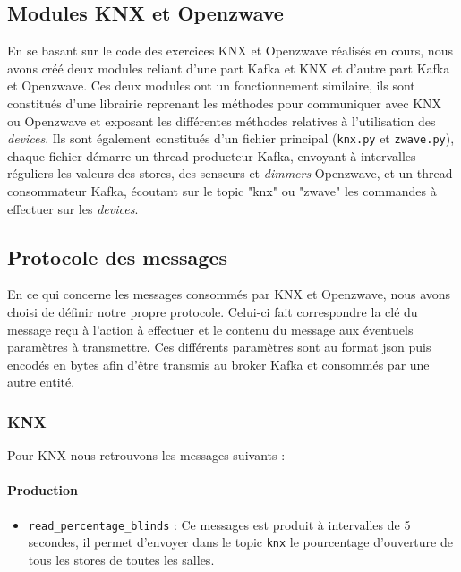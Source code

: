 \subsection{Modules KNX et Openzwave}
En se basant sur le code des exercices KNX et Openzwave réalisés en cours, nous avons créé deux modules reliant d'une part Kafka et KNX et d'autre part Kafka et Openzwave. Ces deux modules ont un fonctionnement similaire, ils sont constitués d'une librairie reprenant les méthodes pour communiquer avec KNX ou Openzwave et exposant les différentes méthodes relatives à l'utilisation des \textit{\textit{devices}}. Ils sont également constitués d'un fichier principal (\texttt{knx.py} et \texttt{zwave.py}), chaque fichier démarre un thread producteur Kafka, envoyant à intervalles réguliers les valeurs des stores, des senseurs et \textit{dimmers} Openzwave, et un thread consommateur Kafka, écoutant sur le topic "knx" ou "zwave" les commandes à effectuer sur les \textit{\textit{devices}}.

\subsection{Protocole des messages}
En ce qui concerne les messages consommés par KNX et Openzwave, nous avons choisi de définir notre propre protocole.
Celui-ci fait correspondre la clé du message reçu à l'action à effectuer et le contenu du message aux éventuels paramètres à transmettre. Ces différents paramètres sont au format \acrshort{json} puis encodés en bytes afin d'être transmis au broker Kafka et consommés par une autre entité.

\subsubsection{KNX}
Pour KNX nous retrouvons les messages suivants : 
\paragraph{Production}
\begin{itemize}
    \item \texttt{read_percentage_blinds} : Ce messages est produit à intervalles de 5 secondes, il permet d'envoyer dans le topic \texttt{knx} le pourcentage d'ouverture de tous les stores de toutes les salles. 
\end{itemize}

